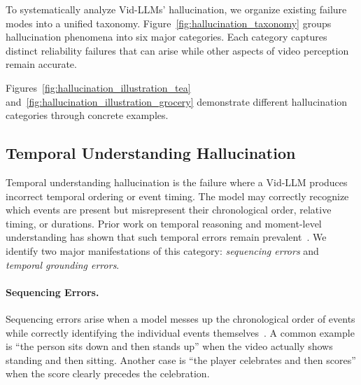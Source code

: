 \documentclass[10pt]{article} %
\begin{document}


To systematically analyze Vid-LLMs' hallucination, we organize existing failure modes into a unified taxonomy. Figure~\ref{fig:hallucination_taxonomy} groups hallucination phenomena into six major categories. Each category captures distinct reliability failures that can arise while other aspects of video perception remain accurate.

Figures~\ref{fig:hallucination_illustration_tea} and~\ref{fig:hallucination_illustration_grocery} demonstrate different hallucination categories through concrete examples. %
\subsection{Temporal Understanding Hallucination}\label{subsec:temporal-hallucination}

Temporal understanding hallucination is the failure where a Vid-LLM produces incorrect temporal ordering or event timing. The model may correctly recognize which events are present but misrepresent their chronological order, relative timing, or durations. Prior work on temporal reasoning and moment-level understanding has shown that such temporal errors remain prevalent~\citep{ahn2025happens,huang2024vtimellm}. We identify two major manifestations of this category: \emph{sequencing errors} and \emph{temporal grounding errors}.

\paragraph{Sequencing Errors.}
Sequencing errors arise when a model messes up the chronological order of events while correctly identifying the individual events themselves~\citep{wu2025season, Plizzari2025OmniaDE, li2025vidhalluc}. A common example is ``the person sits down and then stands up'' when the video actually shows standing and then sitting. Another case is ``the player celebrates and then scores'' when the score clearly precedes the celebration.
\end{document}
